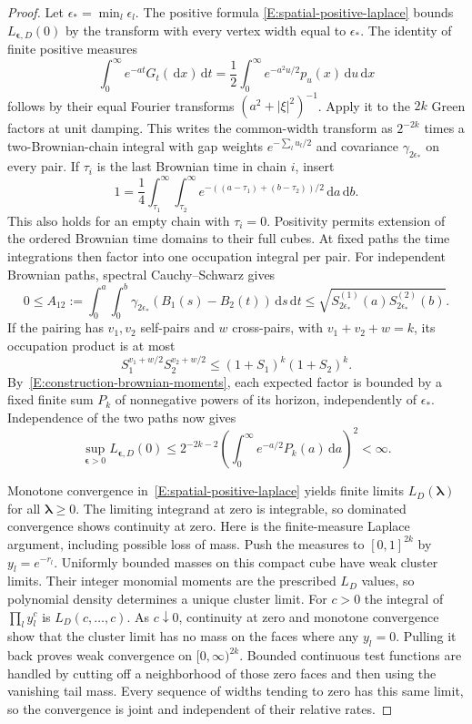 \documentclass[12pt]{article}
\numberwithin{equation}{section}
\theoremstyle{definition}
\newcommand{\ud}{\,\mathrm{d}}
\begin{document}
\begin{proof}
  Let $\epsilon_* =\min_l\epsilon_l$. The positive formula
  \eqref{E:spatial-positive-laplace} bounds $L_{\boldsymbol\epsilon,D}(0)$
  by the transform with every vertex width equal to $\epsilon_*$.
  The identity of finite positive measures
  \[
    \int_0^\infty e^{-at}G_t(\ud x)\ud t
    =\frac12\int_0^\infty e^{-a^2u/2}p_u(x)\ud u\ud x
  \]
  follows by their equal Fourier transforms $(a^2+|\xi|^2)^{-1}$.
  Apply it to the $2k$ Green factors at unit damping. This writes the
  common-width transform as $2^{-2k}$ times a two-Brownian-chain
  integral with gap weights $e^{-\sum_l u_l/2}$ and covariance
  $\gamma_{2\epsilon_*}$ on every pair.
  If $\tau_i$ is the last Brownian time in chain $i$, insert
  \[
    1=\frac14\int_{\tau_1}^\infty\int_{\tau_2}^\infty
    e^{-((a-\tau_1)+(b-\tau_2))/2}\ud a\ud b.
  \]
  This also holds for an empty chain with $\tau_i=0$.
  Positivity permits extension of the ordered Brownian time domains to
  their full cubes. At fixed paths the time integrations then factor
  into one occupation integral per pair.
  For independent Brownian paths, spectral Cauchy--Schwarz gives
  \[
    0\le A_{12}:=\int_0^a\int_0^b
    \gamma_{2\epsilon_*}(B_1(s)-B_2(t))\ud s\ud t
    \le\sqrt{S_{2\epsilon_*}^{(1)}(a)S_{2\epsilon_*}^{(2)}(b)}.
  \]
  If the pairing has $v_1,v_2$ self-pairs and $w$ cross-pairs, with
  $v_1+v_2+w=k$, its occupation product is at most
  \[
    S_1^{v_1+w/2}S_2^{v_2+w/2}\le(1+S_1)^k(1+S_2)^k.
  \]
  By~\eqref{E:construction-brownian-moments}, each expected factor
  is bounded by a fixed finite sum $P_k$ of nonnegative powers of
  its horizon, independently
  of $\epsilon_*$. Independence of the two paths now gives
  \[
    \sup_{\boldsymbol\epsilon>0}L_{\boldsymbol\epsilon,D}(0)
    \le2^{-2k-2}\left(\int_0^\infty e^{-a/2}P_k(a)\ud a\right)^2<\infty.
  \]

  Monotone convergence in~\eqref{E:spatial-positive-laplace} yields
  finite limits $L_D(\boldsymbol\lambda)$ for all
  $\boldsymbol\lambda\ge0$. The limiting integrand at zero is integrable,
  so dominated convergence shows continuity at zero.
  Here is the finite-measure Laplace argument, including possible loss
  of mass. Push the measures to $[0,1]^{2k}$ by $y_l=e^{-r_l}$.
  Uniformly bounded masses on this compact cube have weak cluster limits.
  Their integer monomial moments are the prescribed $L_D$ values, so
  polynomial density determines a unique cluster limit. For $c>0$ the
  integral of $\prod_l y_l^c$ is $L_D(c,\ldots,c)$.
  As $c\downarrow0$, continuity at zero and monotone convergence show
  that the cluster limit has no mass on the faces where any $y_l=0$.
  Pulling it back proves weak convergence on $[0,\infty)^{2k}$.
  Bounded continuous test functions are handled by cutting off a
  neighborhood of those zero faces and then using the vanishing tail mass.
  Every sequence of widths tending to zero has this same limit, so
  the convergence is joint and independent of their relative rates.


\end{proof}
\end{document}
